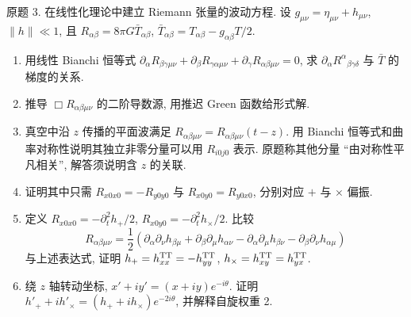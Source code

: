\begin{exercise}\label{ps:8.3}
原题 3. 在线性化理论中建立 Riemann 张量的波动方程. 设 $g_{\mu\nu}=\eta_{\mu\nu}+h_{\mu\nu}$, $\|h\|\ll1$, 且 $R_{\alpha\beta}=8\pi G\bar T_{\alpha\beta}$, $\bar T_{\alpha\beta}=T_{\alpha\beta}-g_{\alpha\beta}T/2$.
\begin{enumerate}[label=(\alph*)]
\item 用线性 Bianchi 恒等式 $\partial_\alpha R_{\beta\gamma\mu\nu}+\partial_\beta R_{\gamma\alpha\mu\nu}+\partial_\gamma R_{\alpha\beta\mu\nu}=0$, 求 $\partial_\alpha R^\alpha{}_{\beta\gamma\delta}$ 与 $\bar T$ 的梯度的关系.
\item 推导 $\Box R_{\alpha\beta\mu\nu}$ 的二阶导数源, 用推迟 Green 函数给形式解.
\item 真空中沿 $z$ 传播的平面波满足 $R_{\alpha\beta\mu\nu}=R_{\alpha\beta\mu\nu}(t-z)$. 用 Bianchi 恒等式和曲率对称性说明其独立非零分量可以用 $R_{i0j0}$ 表示. 原题称其他分量 ``由对称性平凡相关'', 解答须说明含 $z$ 的关联.
\item 证明其中只需 $R_{x0x0}=-R_{y0y0}$ 与 $R_{x0y0}=R_{y0x0}$, 分别对应 $+$ 与 $\times$ 偏振.
\item 定义 $R_{x0x0}=-\partial_t^2h_+/2$, $R_{x0y0}=-\partial_t^2h_\times/2$. 比较
\[
R_{\alpha\beta\mu\nu}=\frac12(\partial_\alpha\partial_\nu h_{\beta\mu}+\partial_\beta\partial_\mu h_{\alpha\nu}-\partial_\alpha\partial_\mu h_{\beta\nu}-\partial_\beta\partial_\nu h_{\alpha\mu})
\]
与上述表达式, 证明 $h_+=h^{\rm TT}_{xx}=-h^{\rm TT}_{yy}$, $h_\times=h^{\rm TT}_{xy}=h^{\rm TT}_{yx}$.
\item 绕 $z$ 轴转动坐标, $x'+iy'=(x+iy)e^{-i\theta}$. 证明 $h'_++ih'_\times=(h_++ih_\times)e^{-2i\theta}$, 并解释自旋权重 2.
\end{enumerate}
\end{exercise}
